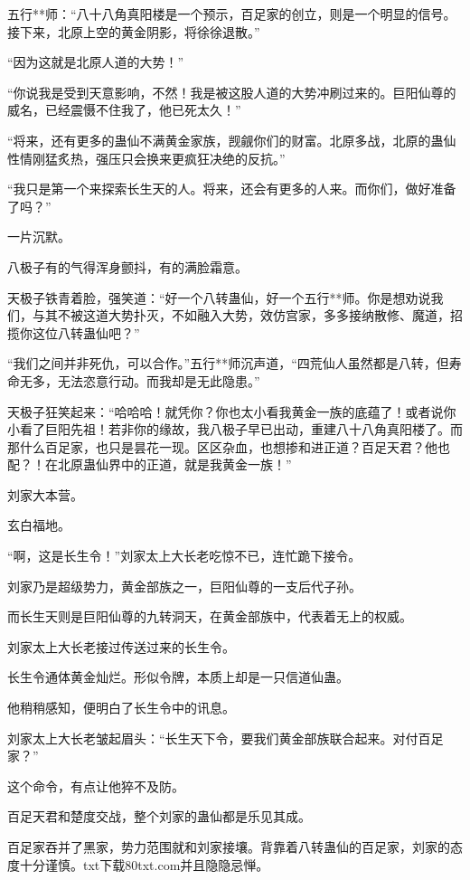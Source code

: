 
\begin{this_body}

五行**师：“八十八角真阳楼是一个预示，百足家的创立，则是一个明显的信号。接下来，北原上空的黄金阴影，将徐徐退散。”

“因为这就是北原人道的大势！”

“你说我是受到天意影响，不然！我是被这股人道的大势冲刷过来的。巨阳仙尊的威名，已经震慑不住我了，他已死太久！”

“将来，还有更多的蛊仙不满黄金家族，觊觎你们的财富。北原多战，北原的蛊仙性情刚猛炙热，强压只会换来更疯狂决绝的反抗。”

“我只是第一个来探索长生天的人。将来，还会有更多的人来。而你们，做好准备了吗？”

一片沉默。

八极子有的气得浑身颤抖，有的满脸霜意。

天极子铁青着脸，强笑道：“好一个八转蛊仙，好一个五行**师。你是想劝说我们，与其不被这道大势扑灭，不如融入大势，效仿宫家，多多接纳散修、魔道，招揽你这位八转蛊仙吧？”

“我们之间并非死仇，可以合作。”五行**师沉声道，“四荒仙人虽然都是八转，但寿命无多，无法恣意行动。而我却是无此隐患。”

天极子狂笑起来：“哈哈哈！就凭你？你也太小看我黄金一族的底蕴了！或者说你小看了巨阳先祖！若非你的缘故，我八极子早已出动，重建八十八角真阳楼了。而那什么百足家，也只是昙花一现。区区杂血，也想掺和进正道？百足天君？他也配？！在北原蛊仙界中的正道，就是我黄金一族！”

刘家大本营。

玄白福地。

“啊，这是长生令！”刘家太上大长老吃惊不已，连忙跪下接令。

刘家乃是超级势力，黄金部族之一，巨阳仙尊的一支后代子孙。

而长生天则是巨阳仙尊的九转洞天，在黄金部族中，代表着无上的权威。

刘家太上大长老接过传送过来的长生令。

长生令通体黄金灿烂。形似令牌，本质上却是一只信道仙蛊。

他稍稍感知，便明白了长生令中的讯息。

刘家太上大长老皱起眉头：“长生天下令，要我们黄金部族联合起来。对付百足家？”

这个命令，有点让他猝不及防。

百足天君和楚度交战，整个刘家的蛊仙都是乐见其成。

百足家吞并了黑家，势力范围就和刘家接壤。背靠着八转蛊仙的百足家，刘家的态度十分谨慎。txt下载80txt.com并且隐隐忌惮。


\end{this_body}
